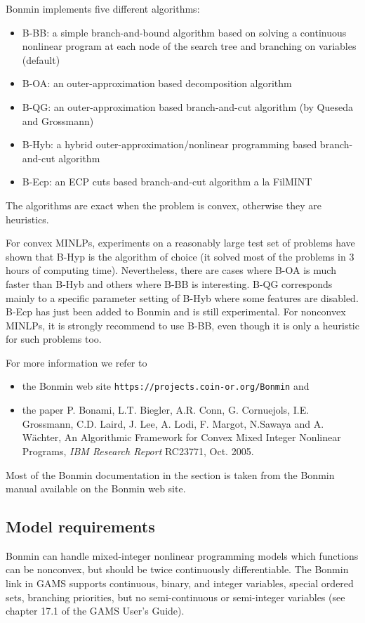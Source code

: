 Bonmin implements five different algorithms:
\begin{itemize}
\item {B-BB}: a simple branch-and-bound algorithm based on solving a continuous nonlinear program at each node of the search tree and branching on variables (default)
\item {B-OA}: an outer-approximation based decomposition algorithm
\item {B-QG}: an outer-approximation based branch-and-cut algorithm (by Queseda and Grossmann)
\item {B-Hyb}: a hybrid outer-approximation/nonlinear programming based branch-and-cut algorithm
\item {B-Ecp}: an ECP cuts based branch-and-cut algorithm a la FilMINT
\end{itemize}
The algorithms are exact when the problem is convex, otherwise they are heuristics.

For convex MINLPs, experiments on a reasonably large test set of problems have shown that B-Hyp is the algorithm of choice (it solved most of the problems in 3 hours of computing time).
Nevertheless, there are cases where B-OA is much faster than B-Hyb and others where B-BB is interesting.
B-QG corresponds mainly to a specific parameter setting of B-Hyb where some features are disabled.
B-Ecp has just been added to Bonmin and is still experimental.
For nonconvex MINLPs, it is strongly recommend to use B-BB, even though it is only a heuristic for such problems too.

For more information we refer to
\begin{itemize}
\item the Bonmin web site \texttt{https://projects.coin-or.org/Bonmin} and
\item the paper P. Bonami, L.T. Biegler, A.R. Conn, G. Cornuejols, I.E. Grossmann, C.D. Laird, J. Lee, A. Lodi, F. Margot, N.Sawaya and A. W\"achter, An Algorithmic Framework for Convex Mixed Integer Nonlinear Programs, \emph{IBM Research Report} RC23771, Oct. 2005.
\end{itemize}
Most of the Bonmin documentation in the section is taken from the Bonmin manual available on the Bonmin web site.

\subsection{Model requirements}

Bonmin can handle mixed-integer nonlinear programming models which functions can be nonconvex, but should be twice continuously differentiable.
The Bonmin link in GAMS supports continuous, binary, and integer variables, special ordered sets, branching priorities, but no semi-continuous or semi-integer variables (see chapter 17.1 of the GAMS User's Guide).

